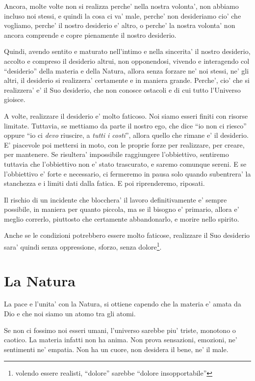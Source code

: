 Ancora, molte volte non si realizza perche' nella nostra volonta', non abbiamo incluso noi stessi, e quindi la cosa ci va' male, perche' non desideriamo cio' che vogliamo, perche' il nostro desiderio e' altro, o perche' la nostra volonta' non ancora comprende e copre pienamente il nostro desiderio.

Quindi, avendo sentito e maturato nell'intimo e nella sincerita' il nostro desiderio, accolto e compreso il desiderio altrui, non opponendosi, vivendo e interagendo col ``desiderio'' della materia e della Natura, allora senza forzare ne' noi stessi, ne' gli altri, il desiderio si realizzera' certamente e in maniera grande. Perche', cio' che si realizzera' e' il Suo desiderio, che non conosce ostacoli e di cui tutto l'Universo gioisce. 

A volte, realizzare il desiderio e' molto faticoso. Noi siamo esseri finiti con risorse limitate. Tuttavia, se mettiamo da parte il nostro ego, che dice ``io non ci riesco'' oppure ``io ci \emph{devo} riuscire, a \emph{tutti i costi}'', allora quello che rimane e' il desiderio. E' piacevole poi mettersi in moto, con le proprie forze per realizzare, per creare, per mantenere. Se risultera' impossibile raggiungere l'obbiettivo, sentiremo tuttavia che l'obbiettivo non e' stato trascurato, e saremo comunque sereni. E se l'obbiettivo e' forte e necessario, ci fermeremo in pausa solo quando subentrera' la stanchezza e i limiti dati dalla fatica. E poi riprenderemo, riposati.

Il rischio di un incidente che blocchera' il lavoro definitivamente e' sempre possibile, in maniera per quanto piccola, ma se il bisogno e' primario, allora e' meglio correrlo, piuttosto che certamente abbandonarlo, e morire nello spirito.

Anche se le condizioni potrebbero essere molto faticose, realizzare il Suo desiderio sara' quindi senza oppressione, sforzo, senza dolore\footnote{volendo essere realisti, ``dolore'' sarebbe ``dolore insopportabile''}.


\section{La Natura}
La pace e l'unita' con la Natura, si ottiene capendo che la materia e' amata da Dio e che noi siamo un atomo tra gli atomi.

Se non ci fossimo noi esseri umani, l'universo sarebbe piu' triste, monotono o caotico. La materia infatti non ha anima. Non prova sensazioni, emozioni, ne' sentimenti ne' empatia. Non ha un cuore, non desidera il bene, ne' il male.

